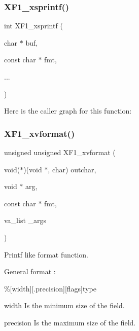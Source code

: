 \mbox{\label{group___x_f1__module_ga0395629bfb289c7da253651b5033253a}} 
\subsubsection{\texorpdfstring{X\+F1\+\_\+xsprintf()}{XF1\_xsprintf()}}
{\footnotesize\ttfamily int X\+F1\+\_\+xsprintf (\begin{DoxyParamCaption}\item[{char $\ast$}]{buf,  }\item[{const char $\ast$}]{fmt,  }\item[{}]{... }\end{DoxyParamCaption})}

Here is the caller graph for this function\+:
\mbox{\label{group___x_f1__module_gafbe3cf6f584b9470ee5aadccefb5a679}} 
\subsubsection{\texorpdfstring{X\+F1\+\_\+xvformat()}{XF1\_xvformat()}}
{\footnotesize\ttfamily unsigned unsigned X\+F1\+\_\+xvformat (\begin{DoxyParamCaption}\item[{void($\ast$)(void $\ast$, char)}]{outchar,  }\item[{void $\ast$}]{arg,  }\item[{const char $\ast$}]{fmt,  }\item[{va\+\_\+list}]{\+\_\+args }\end{DoxyParamCaption})}

Printf like format function.

General format \+:

\%\mbox{[}width\mbox{]}\mbox{[}.precision\mbox{]}\mbox{[}flags\mbox{]}type


\begin{DoxyItemize}
\item width Is the minimum size of the field.
\item precision Is the maximum size of the field.
\end{DoxyItemize}

